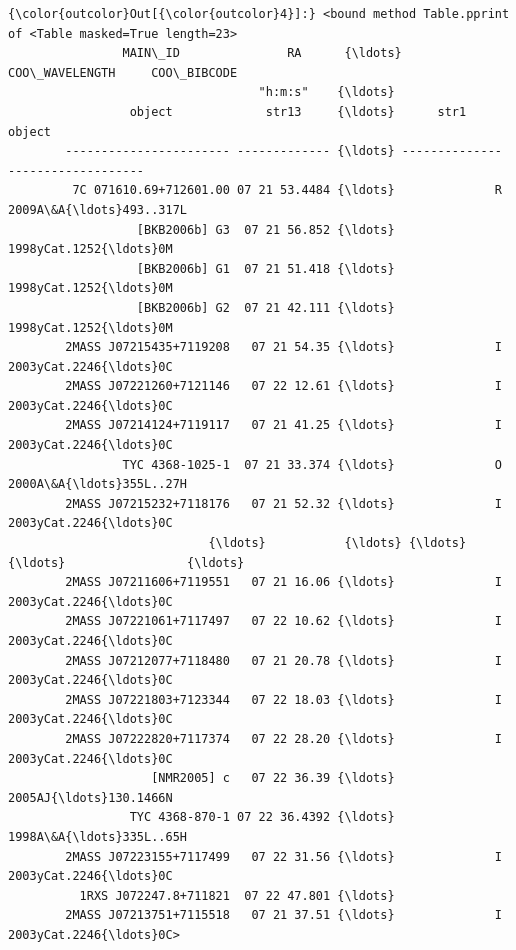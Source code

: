 \documentclass{report}
\begin{document}
            \begin{Verbatim}[commandchars=\\\{\}]
{\color{outcolor}Out[{\color{outcolor}4}]:} <bound method Table.pprint of <Table masked=True length=23>
                MAIN\_ID               RA      {\ldots} COO\_WAVELENGTH     COO\_BIBCODE    
                                   "h:m:s"    {\ldots}                                   
                 object             str13     {\ldots}      str1             object      
        ----------------------- ------------- {\ldots} -------------- -------------------
         7C 071610.69+712601.00 07 21 53.4484 {\ldots}              R 2009A\&A{\ldots}493..317L
                  [BKB2006b] G3  07 21 56.852 {\ldots}                1998yCat.1252{\ldots}0M
                  [BKB2006b] G1  07 21 51.418 {\ldots}                1998yCat.1252{\ldots}0M
                  [BKB2006b] G2  07 21 42.111 {\ldots}                1998yCat.1252{\ldots}0M
        2MASS J07215435+7119208   07 21 54.35 {\ldots}              I 2003yCat.2246{\ldots}0C
        2MASS J07221260+7121146   07 22 12.61 {\ldots}              I 2003yCat.2246{\ldots}0C
        2MASS J07214124+7119117   07 21 41.25 {\ldots}              I 2003yCat.2246{\ldots}0C
                TYC 4368-1025-1  07 21 33.374 {\ldots}              O 2000A\&A{\ldots}355L..27H
        2MASS J07215232+7118176   07 21 52.32 {\ldots}              I 2003yCat.2246{\ldots}0C
                            {\ldots}           {\ldots} {\ldots}            {\ldots}                 {\ldots}
        2MASS J07211606+7119551   07 21 16.06 {\ldots}              I 2003yCat.2246{\ldots}0C
        2MASS J07221061+7117497   07 22 10.62 {\ldots}              I 2003yCat.2246{\ldots}0C
        2MASS J07212077+7118480   07 21 20.78 {\ldots}              I 2003yCat.2246{\ldots}0C
        2MASS J07221803+7123344   07 22 18.03 {\ldots}              I 2003yCat.2246{\ldots}0C
        2MASS J07222820+7117374   07 22 28.20 {\ldots}              I 2003yCat.2246{\ldots}0C
                    [NMR2005] c   07 22 36.39 {\ldots}                2005AJ{\ldots}130.1466N
                 TYC 4368-870-1 07 22 36.4392 {\ldots}                1998A\&A{\ldots}335L..65H
        2MASS J07223155+7117499   07 22 31.56 {\ldots}              I 2003yCat.2246{\ldots}0C
          1RXS J072247.8+711821  07 22 47.801 {\ldots}                                   
        2MASS J07213751+7115518   07 21 37.51 {\ldots}              I 2003yCat.2246{\ldots}0C>
\end{Verbatim}
        
\end{document}
